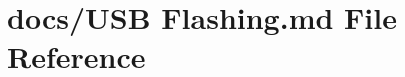 \hypertarget{USB_01Flashing_8md}{\section{docs/\+U\+S\+B Flashing.\+md File Reference}
\label{USB_01Flashing_8md}
}
